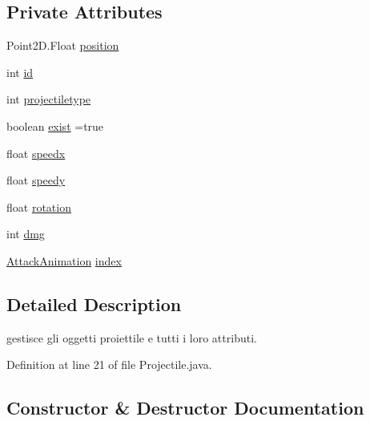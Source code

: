 \subsection*{Private Attributes}
\begin{DoxyCompactItemize}
\item 
Point2\+D.\+Float \hyperlink{classobjects_1_1_projectile_a9d76f6b9dbafc222b1d4ac8a6b1d4894}{position}
\item 
int \hyperlink{classobjects_1_1_projectile_a7441ef0865bcb3db9b8064dd7375c1ea}{id}
\item 
int \hyperlink{classobjects_1_1_projectile_a73505b2eeec69d02880a87f09d4ed6e8}{projectiletype}
\item 
boolean \hyperlink{classobjects_1_1_projectile_a8222e0b6d4ce0639cf85b9bc508fab80}{exist} =true
\item 
float \hyperlink{classobjects_1_1_projectile_a0e51383ba2b26548a0200e855f459416}{speedx}
\item 
float \hyperlink{classobjects_1_1_projectile_a13c57b666f056b5cae3bf6663337792c}{speedy}
\item 
float \hyperlink{classobjects_1_1_projectile_a1fc5a0e5fca1a310e6bfa125bf80042e}{rotation}
\item 
int \hyperlink{classobjects_1_1_projectile_aae5cd11bae27cb7df8bca2fd5fee775e}{dmg}
\item 
\hyperlink{classtowers_1_1_attack_animation}{Attack\+Animation} \hyperlink{classobjects_1_1_projectile_a66fd731a0df8a5ac0e96e7fbdab94e02}{index}
\end{DoxyCompactItemize}


\subsection{Detailed Description}
gestisce gli oggetti proiettile e tutti i loro attributi. 

Definition at line 21 of file Projectile.\+java.



\subsection{Constructor \& Destructor Documentation}
\mbox{\label{classobjects_1_1_projectile_abfa5bb3317d35bef6eb884c6ffcce18e}} 
